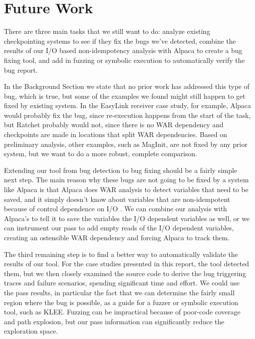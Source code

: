 \section{Future Work}
There are three main tasks that we still want to do: analyze existing checkpointing systems to see if they fix the bugs we've detected, combine the results of our I/O based non-idempotency analysis with Alpaca to create a bug fixing tool, and add in fuzzing or symbolic execution to automatically verify the bug report.

In the Background Section we state that no prior work has addressed this type of bug, which is true, but some of the examples we found might still happen to get fixed by existing system. In the EasyLink receiver case study, for example, Alpaca \cite{alpaca} would probably fix the bug, since re-execution happens from the start of the task, but Ratchet \cite{ratchet} probably would not, since there is no WAR dependency and checkpoints are made in locations that split WAR dependencies. Based on preliminary analysis, other examples, such as MagInit, are not fixed by any prior system, but we want to do a more robust, complete comparison.

Extending our tool from bug detection to bug fixing should be a fairly simple next step. The main reason why these bugs are not going to be fixed by a system like Alpaca is that Alpaca does WAR analysis to detect variables that need to be saved, and it simply doesn't know about variables that are non-idempotent because of control dependence on I/O \cite{alpaca}. We can combine our analysis with Alpaca's to tell it to save the variables the I/O dependent variables as well, or we can instrument our pass to add empty reads of the I/O dependent variables, creating an ostensible WAR dependency and forcing Alpaca to track them.

The third remaining step is to find a better way to automatically validate the results of our tool. For the case studies presented in this report, the tool detected them, but we then closely examined the source code to derive the bug triggering traces and failure scenarios, spending significant time and effort. We could use the pass results, in particular the fact that we can determine the fairly small region where the bug is possible, as a guide for a fuzzer or symbolic execution tool, such as KLEE. Fuzzing can be impractical because of poor-code coverage and path explosion, but our pass information can significantly reduce the exploration space.
